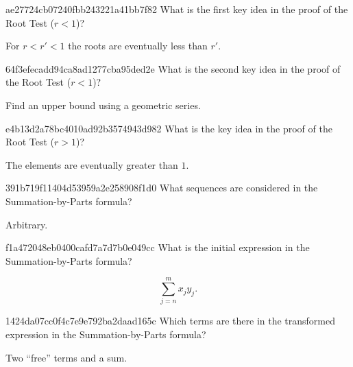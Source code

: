 \begin{note}{ae27724cb07240fbb243221a41bb7f82}
    What is the first key idea in the proof of the Root Test (\({ r < 1 }\))?

    \begin{cloze}{1}
        For \({ r < r' < 1 }\) the roots are eventually less than \({ r' }\).
    \end{cloze}
\end{note}

\begin{note}{64f3efecadd94ca8ad1277cba95ded2e}
    What is the second key idea in the proof of the Root Test (\({ r < 1 }\))?

    \begin{cloze}{1}
        Find an upper bound using a geometric series.
    \end{cloze}
\end{note}

\begin{note}{e4b13d2a78bc4010ad92b3574943d982}
    What is the key idea in the proof of the Root Test (\({ r > 1 }\))?

    \begin{cloze}{1}
        The elements are eventually greater than \({ 1 }\).
    \end{cloze}
\end{note}

\begin{note}{391b719f11404d53959a2e258908f1d0}
    What sequences are considered in the Summation-by-Parts formula?

    \begin{cloze}{1}
        Arbitrary.
    \end{cloze}
\end{note}

\begin{note}{f1a472048eb0400cafd7a7d7b0e049cc}
    What is the initial expression in the Summation-by-Parts formula?

    \begin{cloze}{1}
        \[
            \sum_{j=n}^{m} x_j y_j.
        \]
    \end{cloze}
\end{note}

\begin{note}{1424da07cc0f4c7e9e792ba2daad165c}
    Which terms are there in the transformed expression in the Summation-by-Parts formula?

    \begin{cloze}{1}
        Two ``free'' terms and a sum.
    \end{cloze}
\end{note}

